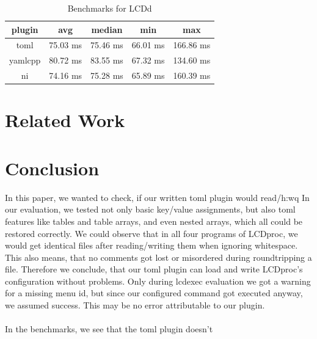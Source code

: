 \documentclass[draft,final]{vutinfth} %
\begin{document}
\FloatBarrier
\begin{table}[!ht]
	\centering
	\begin{tabular}{ccccc}
	\toprule
	plugin & avg & median & min & max \\
	\midrule
	toml 	& 75.03 ms	& 75.46 ms	& 66.01 ms	& 166.86 ms \\
	yamlcpp & 80.72 ms	& 83.55 ms	& 67.32 ms	& 134.60 ms \\
	ni		& 74.16 ms	& 75.28 ms	& 65.89 ms	& 160.39 ms \\
	\bottomrule
	\end{tabular}
	\caption{Benchmarks for LCDd}
	\label{tab:benchmarks}
\end{table}
\FloatBarrier

\chapter{Related Work}

\chapter{Conclusion}
In this paper, we wanted to check, if our written \acrshort{toml} plugin would read/h:wq
In our evaluation, we tested not only basic key/value assignments, but also \acrshort{toml} features like tables and table arrays, and even nested arrays, which all could be restored correctly.
We could observe that in all four programs of LCDproc, we would get identical files after reading/writing them when ignoring whitespace.
This also means, that no comments got lost or misordered during roundtripping a file.
Therefore we conclude, that our \acrshort{toml} plugin can load and write LCDproc's configuration without problems.
Only during lcdexec evaluation we got a warning for a missing menu id, but since our configured command got executed anyway, we assumed success. This may be no error attributable to our plugin.
\\\\
In the benchmarks, we see that the \acrshort{toml} plugin doesn't 

\backmatter

\printindex

\printglossary[type=\acronymtype]

{}

\end{document}
